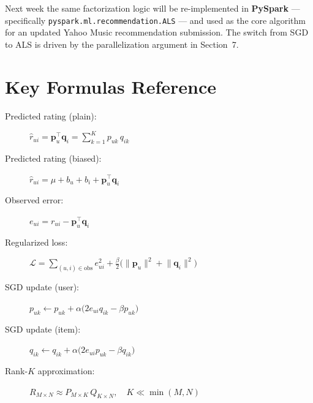 \documentclass[11pt]{article}
\begin{document}
Next week the same factorization logic will be re-implemented in \textbf{PySpark} --- specifically \texttt{pyspark.ml.recommendation.ALS} --- and used as the core algorithm for an updated Yahoo Music recommendation submission. The switch from SGD to ALS is driven by the parallelization argument in Section~7.


\section{Key Formulas Reference}

\begin{description}
    \item[Predicted rating (plain):] \( \hat{r}_{ui} = \mathbf{p}_u^{\top}\mathbf{q}_i = \sum_{k=1}^{K} p_{uk}\, q_{ik} \)
    \item[Predicted rating (biased):] \( \hat{r}_{ui} = \mu + b_u + b_i + \mathbf{p}_u^{\top}\mathbf{q}_i \)
    \item[Observed error:] \( e_{ui} = r_{ui} - \mathbf{p}_u^{\top}\mathbf{q}_i \)
    \item[Regularized loss:] \( \mathcal{L} = \sum_{(u,i)\in\text{obs}} e_{ui}^{2} + \tfrac{\beta}{2}\bigl(\lVert\mathbf{p}_u\rVert^{2} + \lVert\mathbf{q}_i\rVert^{2}\bigr) \)
    \item[SGD update (user):] \( p_{uk} \leftarrow p_{uk} + \alpha\bigl(2 e_{ui} q_{ik} - \beta p_{uk}\bigr) \)
    \item[SGD update (item):] \( q_{ik} \leftarrow q_{ik} + \alpha\bigl(2 e_{ui} p_{uk} - \beta q_{ik}\bigr) \)
    \item[Rank-$K$ approximation:] \( R_{M\times N} \approx P_{M\times K}\,Q_{K\times N}, \quad K \ll \min(M,N) \)
\end{description}
\end{document}
